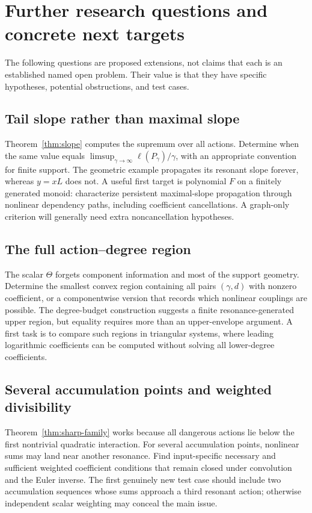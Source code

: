 \documentclass[11pt,a4paper]{article}
\numberwithin{equation}{section}
\theoremstyle{definition}
\theoremstyle{remark}
\begin{document}
\section{Further research questions and concrete next targets}
\label{sec:research}

The following questions are proposed extensions, not claims that each
is an established named open problem. Their value is that they have
specific hypotheses, potential obstructions, and test cases.

\subsection{Tail slope rather than maximal slope}
Theorem~\ref{thm:slope} computes the supremum over all actions. Determine
when the same value equals
\(\limsup_{\gamma\to\infty}\ell(P_\gamma)/\gamma\), with an
appropriate convention for finite support. The geometric example
propagates its resonant slope forever, whereas \(y=xL\) does not.
A useful first target is polynomial \(F\) on a finitely generated
monoid: characterize persistent maximal-slope propagation through
nonlinear dependency paths, including coefficient cancellations.
A graph-only criterion will generally need extra noncancellation
hypotheses.

\subsection{The full action--degree region}
The scalar \(\Theta\) forgets component information and most of the
support geometry. Determine the smallest convex region containing
all pairs \((\gamma,d)\) with nonzero coefficient, or a componentwise
version that records which nonlinear couplings are possible.
The degree-budget construction suggests a finite resonance-generated
upper region, but equality requires more than an upper-envelope
argument. A first task is to compare such regions in triangular
systems, where leading logarithmic coefficients can be computed
without solving all lower-degree coefficients.

\subsection{Several accumulation points and weighted divisibility}
Theorem~\ref{thm:sharp-family} works because all dangerous actions lie
below the first nontrivial quadratic interaction. For several
accumulation points, nonlinear sums may land near another resonance.
Find input-specific necessary and sufficient weighted coefficient
conditions that remain closed under convolution and the Euler
inverse. The first genuinely new test case should include two
accumulation sequences whose sums approach a third resonant action;
otherwise independent scalar weighting may conceal the main issue.
\end{document}

